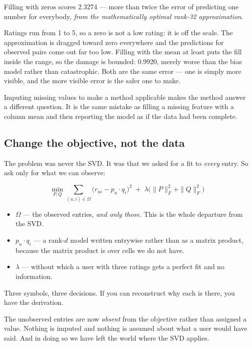 \documentclass[11pt,a4paper]{article}
\begin{document}
Filling with zeros scores 2.3274 --- more than twice the error of predicting
one number for everybody, \emph{from the mathematically optimal rank-32
approximation}.

Ratings run from 1 to 5, so a zero is not a low rating: it is off the scale.
The approximation is dragged toward zero everywhere and the predictions for
observed pairs come out far too low. Filling with the mean at least puts the
fill inside the range, so the damage is bounded: 0.9920, merely worse than the
bias model rather than catastrophic. Both are the same error --- one is simply
more visible, and the more visible error is the safer one to make.

\begin{keybox}[title={The transferable error}]
Imputing missing values to make a method applicable makes the method answer a
different question. It is the same mistake as filling a missing feature with a
column mean and then reporting the model as if the data had been complete.
\end{keybox}

\subsection{Change the objective, not the data}

The problem was never the SVD. It was that we asked for a fit to \emph{every}
entry. So ask only for what we can observe:

\begin{derivbox}[title={The factorisation objective}]
\[
  \min_{P,Q} \sum_{(u,i)\in\Omega} \big(r_{ui} - p_u\cdot q_i\big)^2
  \;+\; \lambda\big(\|P\|_F^2 + \|Q\|_F^2\big)
\]
\begin{itemize}[leftmargin=*,nosep]
  \item $\Omega$ --- the observed entries, \emph{and only those}. This is the
        whole departure from the SVD.
  \item $p_u\cdot q_i$ --- a rank-$d$ model written entrywise rather than as a
        matrix product, because the matrix product is over cells we do not
        have.
  \item $\lambda$ --- without which a user with three ratings gets a perfect
        fit and no information.
\end{itemize}
Three symbols, three decisions. If you can reconstruct why each is there, you
have the derivation.
\end{derivbox}

The unobserved entries are now \emph{absent} from the objective rather than
assigned a value. Nothing is imputed and nothing is assumed about what a user
would have said. And in doing so we have left the world where the SVD applies.
\end{document}
